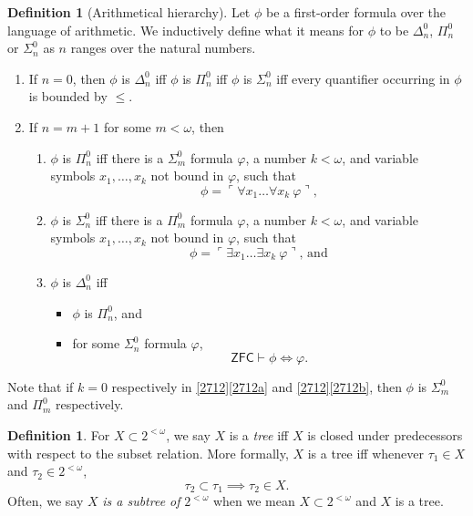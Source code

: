\documentclass[12pt, twoside]{memoir}
\numberwithin{equation}{section}
\theoremstyle{definition}
\newtheorem{defi}[thm]{Definition}
\theoremstyle{remark}
\theoremstyle{definition}
\theoremstyle{definition}
\theoremstyle{definition}
\theoremstyle{remark}
\begin{document}
\begin{defi}[Arithmetical hierarchy]
Let $\phi$ be a first-order formula over the language of arithmetic. We inductively define what it means for $\phi$ to be $\Delta^0_n$, $\Pi^0_n$ or $\Sigma^0_n$ as $n$ ranges over the natural numbers.
\begin{enumerate}[label=(\arabic*)]
    \item If $n = 0$, then $\phi$ is $\Delta^0_n$ iff $\phi$ is $\Pi^0_n$ iff $\phi$ is $\Sigma^0_n$ iff every quantifier occurring in $\phi$ is bounded by $\leq$.
    \item If $n = m + 1$ for some $m < \omega$, then 
    \begin{enumerate}[label=(\alph*)]
        \item $\phi$ is $\Pi^0_n$ iff there is a $\Sigma^0_m$ formula $\varphi$, a number $k < \omega$, and variable symbols $x_1, \dots, x_k$ not bound in $\varphi$, such that 
        \begin{equation*}
            \phi = \ulcorner \forall x_1 \dots \forall x_k \ \varphi \urcorner \text{,}
        \end{equation*}
        \item $\phi$ is $\Sigma^0_n$ iff there is a $\Pi^0_m$ formula $\varphi$, a number $k < \omega$, and variable symbols $x_1, \dots, x_k$ not bound in $\varphi$, such that 
        \begin{equation*}
            \phi = \ulcorner \exists x_1 \dots \exists x_k \ \varphi \urcorner \text{, and}
        \end{equation*}
        \item $\phi$ is $\Delta^0_n$ iff 
        \begin{itemize}[label=$\circ$]
            \item $\phi$ is $\Pi^0_n$, and
            \item for some $\Sigma^0_n$ formula $\varphi$,
            \begin{equation*}
                \mathsf{ZFC} \vdash \phi \iff \varphi \text{.}
            \end{equation*}
        \end{itemize}
    \end{enumerate}
\end{enumerate}
Note that if $k = 0$ respectively in \ref{2712}\ref{2712a} and \ref{2712}\ref{2712b}, then $\phi$ is $\Sigma^0_m$ and $\Pi^0_m$ respectively.
\end{defi}

\begin{defi}
For $X \subset 2^{< \omega}$, we say $X$ is a \emph{tree} iff $X$ is closed under predecessors with respect to the subset relation. More formally, $X$ is a tree iff whenever $\tau_1 \in X$ and $\tau_2 \in 2^{< \omega}$, 
\begin{equation*}
    \tau_2 \subset \tau_1 \implies \tau_2 \in X \text{.}
\end{equation*}
Often, we say $X$ \textit{is a subtree of} $2^{<\omega}$ when we mean $X \subset 2^{< \omega}$ and $X$ is a tree.
\end{defi}
\end{document}
